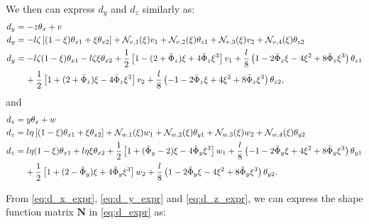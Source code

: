 \documentclass[a4paper,11pt]{article}
\newcommand{\bN}{\mathbf{N}}
\begin{document}
We then can express $d_y$ and $d_z$ similarly as:
\begin{align}
	d_y & = -z\theta_x + v \nonumber \\
	d_y & = -l\zeta \left[ (1-\xi)\theta_{x1} + \xi \theta_{x2} \right] + \mathcal{N}_{v,1}(\xi)v_1 + \mathcal{N}_{v,2}(\xi)\theta_{z1} + \mathcal{N}_{v,3}(\xi)v_2 + \mathcal{N}_{v,4}(\xi)\theta_{z2} \nonumber \\
	d_y & = -l\zeta (1-\xi) \theta_{x1} - l\zeta \xi \theta_{x2} + \frac{1}{2} \left[1 - (2 + \bar{\Phi}_z)\xi + 4\bar{\Phi}_z\xi^3 \right] v_1 +  \frac{l}{8}\left(1 - 2\bar{\Phi}_z\xi - 4\xi^2 + 8\bar{\Phi}_z\xi^3 \right) \theta_{z1} \nonumber \\
	& \text{\hspace{4mm}} + \frac{1}{2} \left[1 + (2 + \bar{\Phi}_z)\xi - 4\bar{\Phi}_z\xi^3 \right] v_2 + \frac{l}{8}\left( -1 - 2\bar{\Phi}_z\xi + 4\xi^2 + 8\bar{\Phi}_z\xi^3 \right) \theta_{z2}, \label{eq:d_y_expr}
\end{align}
and
\begin{align}
	d_z & = y\theta_x + w \nonumber \\
	d_z & = l\eta \left[ (1-\xi)\theta_{x1} + \xi \theta_{x2} \right] + \mathcal{N}_{w,1}(\xi)w_1 + \mathcal{N}_{w,2}(\xi)\theta_{y1} + \mathcal{N}_{w,3}(\xi)w_2 + \mathcal{N}_{w,4}(\xi)\theta_{y2} \nonumber \\
	d_z & = l\eta (1-\xi)\theta_{x1} + l\eta \xi \theta_{x2} + \frac{1}{2} \left[ 1 + (\tilde{\Phi}_y - 2) \xi - 4\tilde{\Phi}_y \xi^3 \right] w_1 + \frac{l}{8} \left( -1 - 2\tilde{\Phi}_y \xi + 4 \xi^2 + 8\tilde{\Phi}_y \xi^3 \right) \theta_{y1} \nonumber \\
	& \text{\hspace{4mm}} + \frac{1}{2} \left[ 1 + (2 - \tilde{\Phi}_y) \xi + 4\tilde{\Phi}_y \xi^3 \right] w_2 + \frac{l}{8} \left( 1 - 2\tilde{\Phi}_y \xi - 4 \xi^2 + 8\tilde{\Phi}_y \xi^3 \right) \theta_{y2}. \label{eq:d_z_expr}
\end{align}

From \eqref{eq:d_x_expr}, \eqref{eq:d_y_expr} and \eqref{eq:d_z_expr}, we can
express the shape function matrix $\bN$ in \eqref{eq:d_expr} as:
\end{document}
